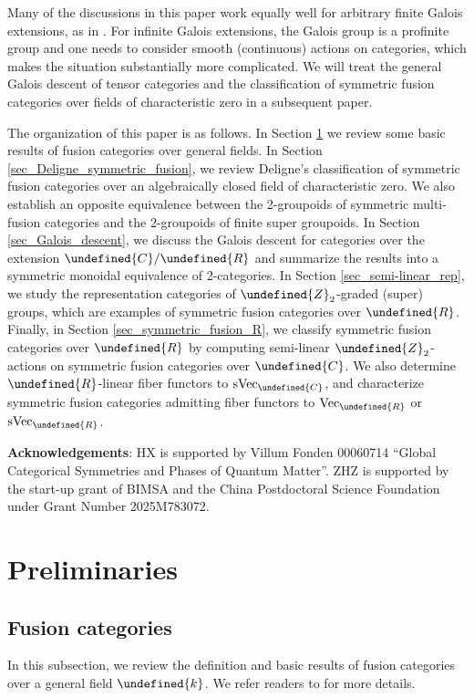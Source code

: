 \documentclass[10pt]{article}
\let\mathbb\undefined
\theoremstyle{definition}
\numberwithin{equation}{section}
\numberwithin{thm}{section}
\newcommand{\Cb}{\mathbb{C}}
\newcommand{\Rb}{\mathbb{R}}
\newcommand{\Zb}{\mathbb{Z}}
\newcommand{\bk}{\mathbb{k}}
\newcommand{\vect}{\mathrm{Vec}}
\newcommand{\svect}{\mathrm{sVec}}
\begin{document}
Many of the discussions in this paper work equally well for arbitrary finite Galois extensions, as in \cite{EG11}. For infinite Galois extensions, the Galois group is a profinite group and one needs to consider smooth (continuous) actions on categories, which makes the situation substantially more complicated. We will treat the general Galois descent of tensor categories and the classification of symmetric fusion categories over fields of characteristic zero in a subsequent paper.

\medskip
The organization of this paper is as follows. In Section \ref{sec_preliminary} we review some basic results of fusion categories over general fields. In Section \ref{sec_Deligne_symmetric_fusion}, we review Deligne's classification of symmetric fusion categories over an algebraically closed field of characteristic zero. We also establish an opposite equivalence between the 2-groupoids of symmetric multi-fusion categories and the 2-groupoids of finite super groupoids. In Section \ref{sec_Galois_descent}, we discuss the Galois descent for categories over the extension $\Cb/\Rb$ and summarize the results into a symmetric monoidal equivalence of 2-categories. In Section \ref{sec_semi-linear_rep}, we study the representation categories of $\Zb_2$-graded (super) groups, which are examples of symmetric fusion categories over $\Rb$. Finally, in Section \ref{sec_symmetric_fusion_R}, we classify symmetric fusion categories over $\Rb$ by computing semi-linear $\Zb_2$-actions on symmetric fusion categories over $\Cb$. We also determine $\Rb$-linear fiber functors to $\svect_\Cb$, and characterize symmetric fusion categories admitting fiber functors to $\vect_\Rb$ or $\svect_\Rb$.

\medskip
\noindent \textbf{Acknowledgements}: HX is supported by Villum Fonden 00060714 ``Global Categorical Symmetries and Phases of Quantum Matter''. ZHZ is supported by the start-up grant of BIMSA and the China Postdoctoral Science Foundation under Grant Number 2025M783072.

\section{Preliminaries} \label{sec_preliminary}

\subsection{Fusion categories}

In this subsection, we review the definition and basic results of fusion categories over a general field $\bk$. We refer readers to \cite{San25} for more details.
\end{document}

